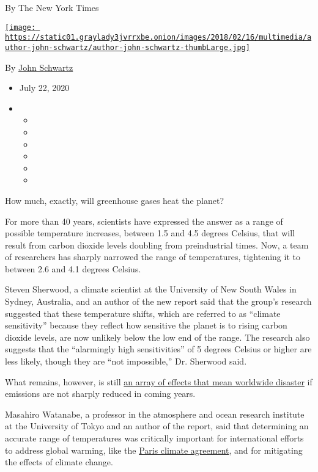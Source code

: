 By The New York Times

\href{https://www.nytimes3xbfgragh.onion/by/john-schwartz}{\texttt{[image: https://static01.graylady3jvrrxbe.onion/images/2018/02/16/multimedia/author-john-schwartz/author-john-schwartz-thumbLarge.jpg]}}

By \href{https://www.nytimes3xbfgragh.onion/by/john-schwartz}{John
Schwartz}

\begin{itemize}
\item
  July 22, 2020
\item
  \begin{itemize}
  \item
  \item
  \item
  \item
  \item
  \item
  \end{itemize}
\end{itemize}

How much, exactly, will greenhouse gases heat the planet?

For more than 40 years, scientists have expressed the answer as a range
of possible temperature increases, between 1.5 and 4.5 degrees Celsius,
that will result from carbon dioxide levels doubling from preindustrial
times. Now, a team of researchers has sharply narrowed the range of
temperatures, tightening it to between 2.6 and 4.1 degrees Celsius.

Steven Sherwood, a climate scientist at the University of New South
Wales in Sydney, Australia, and an author of the new report said that
the group's research suggested that these temperature shifts, which are
referred to as ``climate sensitivity'' because they reflect how
sensitive the planet is to rising carbon dioxide levels, are now
unlikely below the low end of the range. The research also suggests that
the ``alarmingly high sensitivities'' of 5 degrees Celsius or higher are
less likely, though they are ``not impossible,'' Dr. Sherwood said.

What remains, however, is still
\href{https://www.nytimes3xbfgragh.onion/2018/10/07/climate/ipcc-climate-report-2040.html}{an
array of effects that mean worldwide disaster} if emissions are not
sharply reduced in coming years.

Masahiro Watanabe, a professor in the atmosphere and ocean research
institute at the University of Tokyo and an author of the report, said
that determining an accurate range of temperatures was critically
important for international efforts to address global warming, like the
\href{https://www.nytimes3xbfgragh.onion/2015/12/13/world/europe/climate-change-accord-paris.html?action=click\&block=associated_collection_recirc\&impression_id=958581844\&index=1\&pgtype=Article\&region=footer}{Paris
climate agreement}, and for mitigating the effects of climate change.

